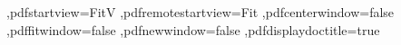 {{  ,pdfstartview=FitV      %
  ,pdfremotestartview=Fit %
  ,pdfcenterwindow=false  %
  ,pdffitwindow=false     %
  ,pdfnewwindow=false     %
  ,pdfdisplaydoctitle=true  %
} %

} %
%



